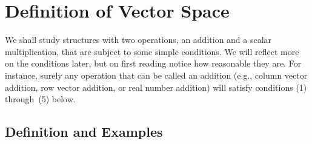 \section{Definition of Vector Space}
We shall study structures with two operations,
an addition and a scalar multiplication, that are subject to some
simple conditions.
We will reflect more on the conditions later,
but on first reading notice how reasonable they are.
For instance, surely any operation that can be called an addition
(e.g., column vector addition, row vector addition, or
real number addition) will satisfy conditions (1) through~(5) below.




\subsection{Definition and Examples}

